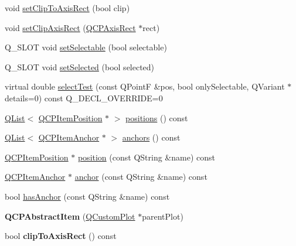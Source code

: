 \begin{DoxyCompactItemize}
\item 
void \hyperlink{class_q_c_p_abstract_item_a39e05b9d4176b9accafc746d16ca6a06}{set\+Clip\+To\+Axis\+Rect} (bool clip)
\item 
void \hyperlink{class_q_c_p_abstract_item_a7dc75fcbcd10206fe0b75d757ea7a347}{set\+Clip\+Axis\+Rect} (\hyperlink{class_q_c_p_axis_rect}{Q\+C\+P\+Axis\+Rect} $\ast$rect)
\item 
Q\+\_\+\+S\+L\+OT void \hyperlink{class_q_c_p_abstract_item_a8a8e32a55bc478b849756a78c2d87fd2}{set\+Selectable} (bool selectable)
\item 
Q\+\_\+\+S\+L\+OT void \hyperlink{class_q_c_p_abstract_item_a203de94ad586cc44d16c9565f49d3378}{set\+Selected} (bool selected)
\item 
virtual double \hyperlink{class_q_c_p_abstract_item_ae41d0349d68bb802c49104afd100ba2a}{select\+Test} (const Q\+PointF \&pos, bool only\+Selectable, Q\+Variant $\ast$details=0) const Q\+\_\+\+D\+E\+C\+L\+\_\+\+O\+V\+E\+R\+R\+I\+DE=0
\item 
\hyperlink{class_q_list}{Q\+List}$<$ \hyperlink{class_q_c_p_item_position}{Q\+C\+P\+Item\+Position} $\ast$ $>$ \hyperlink{class_q_c_p_abstract_item_adf6a680cc29a6bce8345c3b6af3a91a1}{positions} () const 
\item 
\hyperlink{class_q_list}{Q\+List}$<$ \hyperlink{class_q_c_p_item_anchor}{Q\+C\+P\+Item\+Anchor} $\ast$ $>$ \hyperlink{class_q_c_p_abstract_item_a8454b9941960b840608a5a1e00b1977d}{anchors} () const 
\item 
\hyperlink{class_q_c_p_item_position}{Q\+C\+P\+Item\+Position} $\ast$ \hyperlink{class_q_c_p_abstract_item_af71345bd150f87fa1d2442837b87bb59}{position} (const Q\+String \&name) const 
\item 
\hyperlink{class_q_c_p_item_anchor}{Q\+C\+P\+Item\+Anchor} $\ast$ \hyperlink{class_q_c_p_abstract_item_abed974cba7cc02608c71dad4638e008d}{anchor} (const Q\+String \&name) const 
\item 
bool \hyperlink{class_q_c_p_abstract_item_acbce9e5ba5252541d19db0c40303357a}{has\+Anchor} (const Q\+String \&name) const 
\item 
{\bfseries Q\+C\+P\+Abstract\+Item} (\hyperlink{class_q_custom_plot}{Q\+Custom\+Plot} $\ast$parent\+Plot)\hypertarget{class_q_c_p_abstract_item_a9922507d8b4503a1fe1ed0b1030e23b6}{}\label{class_q_c_p_abstract_item_a9922507d8b4503a1fe1ed0b1030e23b6}

\item 
bool {\bfseries clip\+To\+Axis\+Rect} () const \hypertarget{class_q_c_p_abstract_item_a5b0ea171823033bcb8aee81f4a034871}{}\label{class_q_c_p_abstract_item_a5b0ea171823033bcb8aee81f4a034871}


\end{DoxyCompactItemize}
